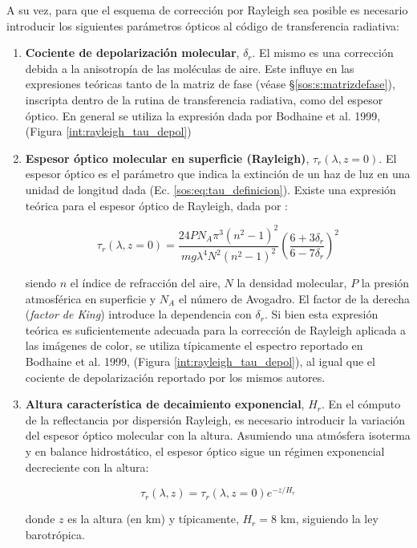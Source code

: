     A su vez, para que el esquema de corrección por Rayleigh sea posible es necesario introducir los siguientes parámetros ópticos al código de transferencia radiativa:
    
    \begin{enumerate}
    
        \item \textbf{Cociente de depolarización molecular}, $\delta_{r}$. El mismo es una corrección debida a la anisotropía de las moléculas de aire. Este influye en las expresiones teóricas tanto de la matriz de fase (véase \S \ref{sos:s:matrizdefase}), inscripta dentro de la rutina de transferencia radiativa, como del espesor óptico. En general se utiliza la expresión dada por Bodhaine et al. 1999, \cite{bodhaine1999} (Figura \ref{int:rayleigh_tau_depol})
        
        \item \textbf{Espesor óptico molecular en superficie (Rayleigh)}, $\tau_{r}(\lambda, z = 0)$. El espesor óptico es el parámetro que indica la extinción de un haz de luz en una unidad de longitud dada (Ec. \ref{sos:eq:tau_definicion}). Existe una expresión teórica para el espesor óptico de Rayleigh, dada por \cite{bodhaine1999}:

        \begin{equation}
            \tau_{r}(\lambda, z = 0) = \frac{24 P N_{A}\pi^{3}(n^{2}-1)^{2}}{mg\lambda^{4}N^{2}(n^{2}-1)^{2}}\left(\frac{6+3\delta_{r}}{6-7\delta_{r}}\right)^{2}
            \label{int:eq:taur}
        \end{equation}

        \noindent siendo $n$ el índice de refracción del aire, $N$ la densidad molecular, $P$ la presión atmosférica en superficie y $N_{A}$ el número de Avogadro. El factor de la derecha (\textit{factor de King}) introduce la dependencia con $\delta_{r}$. Si bien esta expresión teórica es suficientemente adecuada para la corrección de Rayleigh aplicada a las imágenes de color, se utiliza típicamente el espectro reportado en Bodhaine et al. 1999, \cite{bodhaine1999} (Figura \ref{int:rayleigh_tau_depol}), al igual que el cociente de depolarización reportado por los mismos autores.

        \item \textbf{Altura característica de decaimiento exponencial}, $H_{r}$. En el cómputo de la reflectancia por dispersión Rayleigh, es necesario introducir la variación del espesor óptico molecular con la altura. Asumiendo una atmósfera isoterma y en balance hidrostático, el espesor óptico sigue un régimen exponencial decreciente con la altura:
    
        \begin{equation}
            \tau_{r}(\lambda, z) = \tau_{r}(\lambda, z = 0)e^{-z/H_{r}}
            \label{int:eq:hray}
        \end{equation}

        \noindent donde $z$ es la altura (en km) y típicamente, $H_{r} = 8$ km, siguiendo la ley barotrópica.
    \end{enumerate} 


